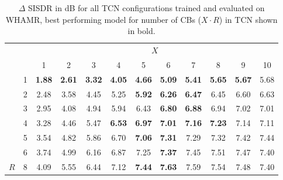 \documentclass[conference,a4paper]{IEEEtran}
\begin{document}
\begin{table}[!ht]
\setlength\tabcolsep{2.5pt}
\caption{ $\Delta$ \ac{SISDR} {in dB}
for all TCN configurations trained and evaluated on WHAMR, best performing model for number of \acp{CB} ($X\cdot R$) in \ac{TCN} shown in bold.} 
\centering
\begin{tabular}{cc|cccccccccc|}
\cline{3-12}
&  & \multicolumn{10}{c|}{\cellcolor[HTML]{C0C0C0} $X$}\\ 
\cline{3-12} 
 &  & 
 \cellcolor[HTML]{C0C0C0}1 & \cellcolor[HTML]{C0C0C0}2 & \cellcolor[HTML]{C0C0C0}3 & \cellcolor[HTML]{C0C0C0}4 & \cellcolor[HTML]{C0C0C0}5 & \cellcolor[HTML]{C0C0C0}6 & \cellcolor[HTML]{C0C0C0}7 & \cellcolor[HTML]{C0C0C0}8 & \cellcolor[HTML]{C0C0C0}9 & \cellcolor[HTML]{C0C0C0}10 \\ \hline
\multicolumn{1}{|c}{\cellcolor[HTML]{C0C0C0}} & \multicolumn{1}{|c|}{\cellcolor[HTML]{C0C0C0}1} & \bfseries 1.88 & \bfseries 2.61 &  \bfseries 3.32 & \bfseries 4.05 & \bfseries 4.66 & \bfseries 5.09 & \bfseries 5.41 & \bfseries 5.65 & \bfseries 5.67 & 5.68 \\
\multicolumn{1}{|c}{\cellcolor[HTML]{C0C0C0}}& \multicolumn{1}{|c|}{\cellcolor[HTML]{C0C0C0}2} & 2.48 & 3.58 & 4.45 & 5.25 & \bfseries 5.92 & \bfseries 6.26 & \bfseries 6.47 & 6.45 & 6.60 & 6.63 \\
\multicolumn{1}{|c}{\cellcolor[HTML]{C0C0C0}}& \multicolumn{1}{|c|}{\cellcolor[HTML]{C0C0C0}3} & 2.95 & 4.08 & 4.94 & 5.94 & 6.43 & \bfseries 6.80 & \bfseries 6.88 & 6.94 & 7.02 & 7.01 \\
\multicolumn{1}{|c}{\cellcolor[HTML]{C0C0C0}} & \multicolumn{1}{|c|}{\cellcolor[HTML]{C0C0C0}4} & 3.28 & 4.46 & 5.47 & \bfseries 6.53 & \bfseries 6.97 & \bfseries 7.01 & \bfseries 7.16 & \bfseries 7.23 & 7.14 & 7.11 \\
\multicolumn{1}{|c}{\cellcolor[HTML]{C0C0C0}} & \multicolumn{1}{|c|}{\cellcolor[HTML]{C0C0C0}5} & 3.54 & 4.82 & 5.86 & 6.70 & \bfseries 7.06 & \bfseries 7.31 & 7.29 & 7.32 & 7.42 & 7.44 \\
\multicolumn{1}{|c}{\cellcolor[HTML]{C0C0C0}} & \multicolumn{1}{|c|}{\cellcolor[HTML]{C0C0C0}6} & 3.74 & 4.99 & 6.16 & 6.87 & 7.25 & \bfseries 7.37 & 7.45 &  7.51 & 7.47 & 7.4{0} \\ 
\multicolumn{1}{|c}{\multirow{-8}{*}{\cellcolor[HTML]{C0C0C0}$R$}} & \multicolumn{1}{|l|}{\cellcolor[HTML]{C0C0C0}8} & 4.09 & 5.55 & 6.44 & 7.12 & \bfseries 7.44 & \bfseries 7.63 & 7.59 & 7.54 & 7.48 & 7.4{0} \\ \hline
\end{tabular}
\label{tab:d_sisdr_results:whamr}
\end{table}
\end{document}

